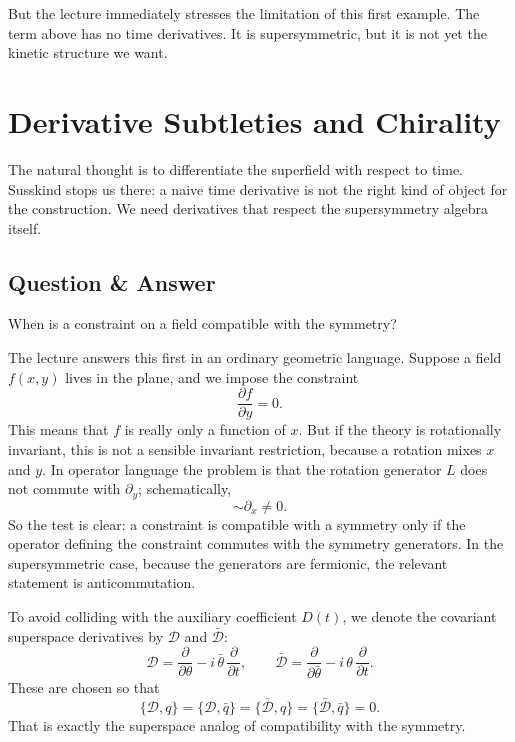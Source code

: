 But the lecture immediately stresses the limitation of this first example. The term above has no time derivatives. It is supersymmetric, but it is not yet the kinetic structure we want.

\section{Derivative Subtleties and Chirality}

The natural thought is to differentiate the superfield with respect to time. Susskind stops us there: a naive time derivative is not the right kind of object for the construction. We need derivatives that respect the supersymmetry algebra itself.

\subsection{Question \& Answer}

When is a constraint on a field compatible with the symmetry?

The lecture answers this first in an ordinary geometric language. Suppose a field \(f(x,y)\) lives in the plane, and we impose the constraint
\begin{equation}
\frac{\partial f}{\partial y}=0.
\end{equation}
This means that \(f\) is really only a function of \(x\). But if the theory is rotationally invariant, this is not a sensible invariant restriction, because a rotation mixes \(x\) and \(y\). In operator language the problem is that the rotation generator \(L\) does not commute with \(\partial_y\); schematically,
\begin{equation}
[\partial_y,L] \sim \partial_x \neq 0.
\end{equation}
So the test is clear: a constraint is compatible with a symmetry only if the operator defining the constraint commutes with the symmetry generators. In the supersymmetric case, because the generators are fermionic, the relevant statement is anticommutation.

To avoid colliding with the auxiliary coefficient \(D(t)\), we denote the covariant superspace derivatives by \(\mathcal D\) and \(\bar{\mathcal D}\):
\begin{equation}
\mathcal D = \frac{\partial}{\partial \theta} - i\,\bar\theta\,\frac{\partial}{\partial t},
\qquad
\bar{\mathcal D} = \frac{\partial}{\partial \bar\theta} - i\,\theta\,\frac{\partial}{\partial t}.
\end{equation}
These are chosen so that
\begin{equation}
\{\mathcal D,q\}=\{\mathcal D,\bar q\}=\{\bar{\mathcal D},q\}=\{\bar{\mathcal D},\bar q\}=0.
\end{equation}
That is exactly the superspace analog of compatibility with the symmetry.

